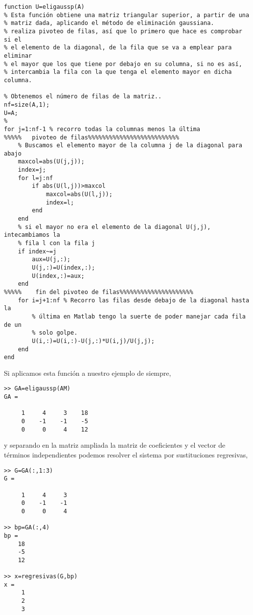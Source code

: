 \begin{lstlisting}
function U=eligaussp(A)
% Esta función obtiene una matriz triangular superior, a partir de una
% matriz dada, aplicando el método de eliminación gaussiana.
% realiza pivoteo de filas, así que lo primero que hace es comprobar si el
% el elemento de la diagonal, de la fila que se va a emplear para eliminar
% el mayor que los que tiene por debajo en su columna, si no es así,
% intercambia la fila con la que tenga el elemento mayor en dicha columna.

% Obtenemos el número de filas de la matriz..
nf=size(A,1);
U=A;
%
for j=1:nf-1 % recorro todas la columnas menos la última
%%%%%   pivoteo de filas%%%%%%%%%%%%%%%%%%%%%%%%%%    
    % Buscamos el elemento mayor de la columna j de la diagonal para abajo
    maxcol=abs(U(j,j));
    index=j;
    for l=j:nf
        if abs(U(l,j))>maxcol
            maxcol=abs(U(l,j));
            index=l;
        end
    end
    % si el mayor no era el elemento de la diagonal U(j,j), intecambiamos la
    % fila l con la fila j
    if index~=j
        aux=U(j,:);
        U(j,:)=U(index,:);
        U(index,:)=aux;
    end
%%%%%    fin del pivoteo de filas%%%%%%%%%%%%%%%%%%%%%    
    for i=j+1:nf % Recorro las filas desde debajo de la diagonal hasta la 
        % última en Matlab tengo la suerte de poder manejar cada fila de un 
        % solo golpe.
        U(i,:)=U(i,:)-U(j,:)*U(i,j)/U(j,j);
    end
end
\end{lstlisting}

Si aplicamos esta función a nuestro ejemplo de siempre,
\begin{verbatim}
>> GA=eligaussp(AM)
GA =

     1     4     3    18
     0    -1    -1    -5
     0     0     4    12
\end{verbatim}

y separando en la matriz ampliada la matriz de coeficientes y el vector de términos independientes podemos resolver el sistema por sustituciones regresivas,

\begin{verbatim}
>> G=GA(:,1:3)
G =

     1     4     3
     0    -1    -1
     0     0     4

>> bp=GA(:,4)
bp =
    18
    -5
    12

>> x=regresivas(G,bp)
x =
     1
     2
     3

\end{verbatim}

